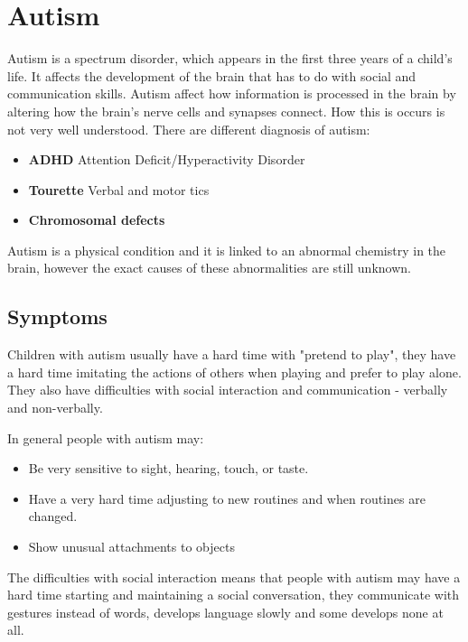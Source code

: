 \section{Autism}

Autism is a spectrum disorder, which appears in the first three years of a child's life. It affects the development of the brain that has to do with social and communication skills. Autism affect how information is processed in the brain by altering how the brain's nerve cells and synapses connect. How this is occurs is not very well understood.\citep{autism} There are different diagnosis of autism:

\begin{itemize}
\item \textbf{ADHD} Attention Deficit/Hyperactivity Disorder
\item \textbf{Tourette} Verbal and motor tics
\item \textbf{Chromosomal defects}
\end{itemize}

Autism is a physical condition and it is linked to an abnormal chemistry in the brain, however the exact causes of these abnormalities are still unknown.\citep{autism}

\subsection*{Symptoms}

Children with autism usually have a hard time with "pretend to play", they have a hard time imitating the actions of others when playing and prefer to play alone. They also have difficulties with social interaction and communication - verbally and non-verbally. 

In general people with autism may:

\begin{itemize}
\item Be very sensitive to sight, hearing, touch, or taste.
\item Have a very hard time adjusting to new routines and when routines are changed.
\item Show unusual attachments to objects
\end{itemize}

The difficulties with social interaction means that people with autism may have a hard time starting and maintaining a social conversation, they communicate with gestures instead of words, develops language slowly and some develops none at all. 


